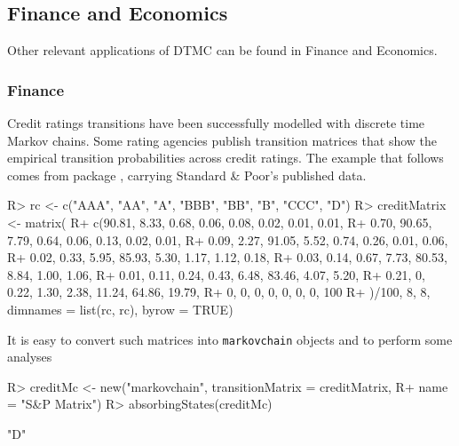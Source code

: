 \documentclass[article,nojss]{jss}
\begin{document}
\hypertarget{app:fin}{%
\subsection{Finance and Economics}\label{app:fin}}

Other relevant applications of DTMC can be found in Finance and Economics.

\hypertarget{fin:fin}{%
\subsubsection{Finance}\label{fin:fin}}

Credit ratings transitions have been successfully modelled with discrete time Markov chains. Some rating agencies publish transition matrices that show the empirical transition probabilities across credit ratings. The example that follows
comes from   package \citep{CreditMetricsR},
carrying Standard \& Poor's published data.

\begin{CodeChunk}

\begin{CodeInput}
R> rc <- c("AAA", "AA", "A", "BBB", "BB", "B", "CCC", "D")
R> creditMatrix <- matrix(
R+   c(90.81, 8.33, 0.68, 0.06, 0.08, 0.02, 0.01, 0.01,
R+     0.70, 90.65, 7.79, 0.64, 0.06, 0.13, 0.02, 0.01,
R+     0.09, 2.27, 91.05, 5.52, 0.74, 0.26, 0.01, 0.06,
R+     0.02, 0.33, 5.95, 85.93, 5.30, 1.17, 1.12, 0.18,
R+     0.03, 0.14, 0.67, 7.73, 80.53, 8.84, 1.00, 1.06,
R+     0.01, 0.11, 0.24, 0.43, 6.48, 83.46, 4.07, 5.20,
R+     0.21, 0, 0.22, 1.30, 2.38, 11.24, 64.86, 19.79,
R+     0, 0, 0, 0, 0, 0, 0, 100
R+    )/100, 8, 8, dimnames = list(rc, rc), byrow = TRUE)
\end{CodeInput}
\end{CodeChunk}

It is easy to convert such matrices into \texttt{markovchain} objects and to perform some analyses

\begin{CodeChunk}

\begin{CodeInput}
R> creditMc <- new("markovchain", transitionMatrix = creditMatrix, 
R+                 name = "S&P Matrix")
R> absorbingStates(creditMc)
\end{CodeInput}

\begin{CodeOutput}
[1] "D"
\end{CodeOutput}
\end{CodeChunk}
\end{document}
